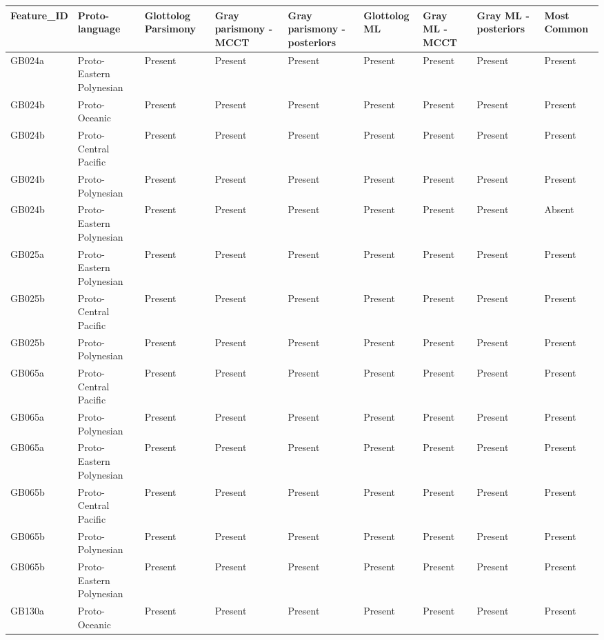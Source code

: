 \begin{longtable}{p{1.5cm}p{2.5cm}p{2.5cm}p{2.5cm}p{2.5cm}p{2.5cm}p{2.5cm}p{2.5cm}p{2.5cm}}
  \toprule
Feature\_ID & Proto-language & Glottolog Parsimony & Gray parismony -MCCT & Gray parismony -posteriors & Glottolog ML & Gray ML -MCCT & Gray ML -posteriors & Most Common \\ 
  \midrule
GB024a & Proto-Eastern Polynesian & Present & Present & Present & Present & Present & Present & Present \\ 
  GB024b & Proto-Oceanic & Present & Present & Present & Present & Present & Present & Present \\ 
  GB024b & Proto-Central Pacific & Present & Present & Present & Present & Present & Present & Present \\ 
  GB024b & Proto-Polynesian & Present & Present & Present & Present & Present & Present & Present \\ 
  GB024b & Proto-Eastern Polynesian & Present & Present & Present & Present & Present & Present & Absent \\ 
  GB025a & Proto-Eastern Polynesian & Present & Present & Present & Present & Present & Present & Present \\ 
  GB025b & Proto-Central Pacific & Present & Present & Present & Present & Present & Present & Present \\ 
  GB025b & Proto-Polynesian & Present & Present & Present & Present & Present & Present & Present \\ 
  GB065a & Proto-Central Pacific & Present & Present & Present & Present & Present & Present & Present \\ 
  GB065a & Proto-Polynesian & Present & Present & Present & Present & Present & Present & Present \\ 
  GB065a & Proto-Eastern Polynesian & Present & Present & Present & Present & Present & Present & Present \\ 
  GB065b & Proto-Central Pacific & Present & Present & Present & Present & Present & Present & Present \\ 
  GB065b & Proto-Polynesian & Present & Present & Present & Present & Present & Present & Present \\ 
  GB065b & Proto-Eastern Polynesian & Present & Present & Present & Present & Present & Present & Present \\ 
  GB130a & Proto-Oceanic & Present & Present & Present & Present & Present & Present & Present \\ 

\end{longtable}
